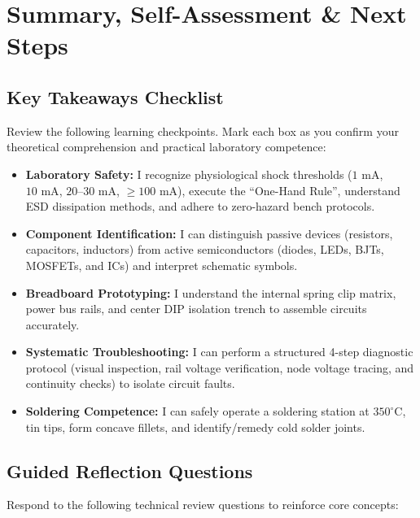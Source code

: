 \chapter{Summary, Self-Assessment \& Next Steps}

\section{Key Takeaways Checklist}
Review the following learning checkpoints. Mark each box as you confirm your theoretical comprehension and practical laboratory competence:

\begin{itemize}[leftmargin=2em]
    \item[$\square$] \textbf{Laboratory Safety:} I recognize physiological shock thresholds ($1\text{ mA}$, $10\text{ mA}$, $20\text{--}30\text{ mA}$, $\ge 100\text{ mA}$), execute the ``One-Hand Rule'', understand ESD dissipation methods, and adhere to zero-hazard bench protocols.
    \item[$\square$] \textbf{Component Identification:} I can distinguish passive devices (resistors, capacitors, inductors) from active semiconductors (diodes, LEDs, BJTs, MOSFETs, and ICs) and interpret schematic symbols.
    \item[$\square$] \textbf{Breadboard Prototyping:} I understand the internal spring clip matrix, power bus rails, and center DIP isolation trench to assemble circuits accurately.
    \item[$\square$] \textbf{Systematic Troubleshooting:} I can perform a structured 4-step diagnostic protocol (visual inspection, rail voltage verification, node voltage tracing, and continuity checks) to isolate circuit faults.
    \item[$\square$] \textbf{Soldering Competence:} I can safely operate a soldering station at $350^\circ\text{C}$, tin tips, form concave fillets, and identify/remedy cold solder joints.
\end{itemize}

\section{Guided Reflection Questions}
Respond to the following technical review questions to reinforce core concepts:

